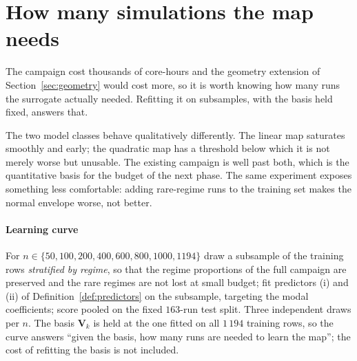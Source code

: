 \documentclass[11pt,a4paper]{article}
\newcommand{\vect}[1]{\mathbf{#1}}
\theoremstyle{plain}
\theoremstyle{definition}
\theoremstyle{remark}
\begin{document}
\section{How many simulations the map needs}
\label{sec:curves}

The campaign cost thousands of core-hours and the geometry extension of
Section~\ref{sec:geometry} would cost more, so it is worth knowing how many runs
the surrogate actually needed. Refitting it on subsamples, with the basis held
fixed, answers that.

The two model classes behave qualitatively differently. The linear map saturates
smoothly and early; the quadratic map has a threshold below which it is not
merely worse but unusable. The existing campaign is well past both, which is the
quantitative basis for the budget of the next phase. The same experiment exposes
something less comfortable: adding rare-regime runs to the training set makes the
normal envelope worse, not better.

\label{def:curve}
\paragraph{Learning curve}
For $n \in \{50,100,200,400,600,800,1000,1194\}$ draw a subsample of the
training rows \emph{stratified by regime}, so that the regime proportions of the
full campaign are preserved and the rare regimes are not lost at small budget;
fit predictors (i) and (ii) of Definition~\ref{def:predictors} on the
subsample, targeting the modal coefficients; score pooled on the fixed
$163$-run test split. Three independent draws per $n$. The basis $\vect{V}_k$ is
held at the one fitted on all $1\,194$ training rows, so the curve answers
``given the basis, how many runs are needed to learn the map''; the cost of
refitting the basis is not included.
\end{document}
